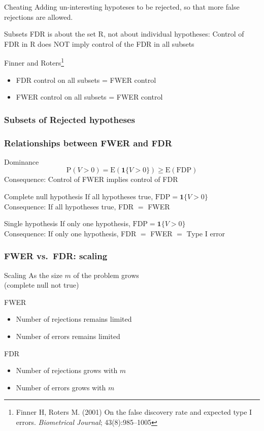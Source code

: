 \documentclass[xcolor={pdftex,dvipsnames,table}]{beamer}
\newcommand{\bb}[1]{\begin{block}{#1}}
\newcommand{\eb}{\end{block}}
\newcommand{\bi}{\begin {itemize}}
\newcommand{\ei}{\end{itemize}}
\newcommand{\bfr}[1]{\begin{frame} \frametitle{#1}}
\begin{document}
\bfr{}
\bb{Cheating}
Adding un-interesting hypoteses to be rejected, so that more false rejections are allowed.
\eb
\pause
\bb{Subsets}
FDR is about the set R, not about individual hypotheses:
Control of FDR in R does NOT imply control of the FDR in all subsets\\
\eb
\bb{Finner and Roters\footnote{Finner H, Roters M. (2001) On the false discovery rate and expected type I errors. {\it Biometrical Journal}; 43(8):985--1005}}
    \bi
      \item FDR control on all subsets = FWER control
      \item FWER control on all subsets = FWER control
    \ei
\eb
\end{frame}

\bfr{Subsets of Rejected hypotheses}
\end{frame}




\bfr{Relationships between FWER and FDR}
  \bb{Dominance}
    \[ \mathrm{P}(V > 0) = \mathrm{E}(\boldsymbol{1}\{V > 0\}) \geq \mathrm{E}(\mathrm{FDP}) \]
    Consequence: Control of FWER implies control of FDR
  \eb
  \bb{Complete null hypothesis}
    If all hypotheses true, $\mathrm{FDP} = \boldsymbol{1}\{V > 0\}$
    \\ Consequence: If all hypotheses true, FDR $=$ FWER
  \eb
  \bb{Single hypothesis}
    If only one hypothesis, $\mathrm{FDP} = \boldsymbol{1}\{V > 0\}$
    \\ Consequence: If only one hypothesis, FDR $=$ FWER $=$ Type I error
  \eb
\end{frame}


\bfr{FWER vs.\ FDR: scaling}
  \bb{Scaling}
    As the size $m$ of the problem grows \\(complete null not true)
  \eb
  \bb{FWER}
    \bi
      \item Number of rejections remains limited
      \item Number of errors remains limited
    \ei
  \eb
  \bb{FDR}
    \bi
      \item Number of rejections grows with $m$
      \item Number of errors grows with $m$
    \ei
  \eb
\end{frame}
\end{document}
